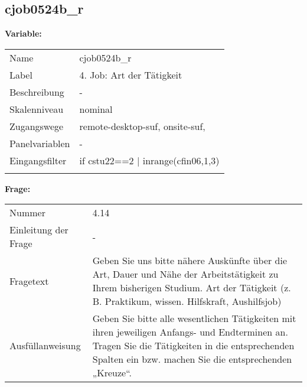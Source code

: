 	
	
	\subsection{cjob0524b\_r}
	\label{subSection:cjob0524b_r}

	\noindent\textbf{Variable:}\\
		\begin{tabular}{lL{11.3cm}}
			\label{tableVariable:cjob0524b_r}
			Name & cjob0524b\_r \\
			Label & 4. Job: Art der Tätigkeit \\
			Beschreibung & - \\
			Skalenniveau & nominal \\
			Zugangswege &
				remote-desktop-suf,
				onsite-suf,
 \\
			Panelvariablen & -
			 \\
			Eingangsfilter & if cstu22==2 | inrange(cfin06,1,3) \\
 \\
		\end{tabular}

		\vspace*{1 cm}
		\noindent\textbf{Frage:}\\
		\begin{tabular}{lL{11.3cm}}
			\label{tableQuestion:cjob0524b_r}
			Nummer & 4.14 \\
			Einleitung der Frage & - \\
			Fragetext & Geben Sie uns bitte nähere Auskünfte über die Art, Dauer und Nähe der Arbeitstätigkeit zu Ihrem bisherigen Studium.
Art der Tätigkeit
(z. B. Praktikum, wissen. Hilfskraft, Aushilfsjob) \\
			Ausfüllanweisung & Geben Sie bitte alle wesentlichen Tätigkeiten mit ihren jeweiligen Anfangs- und Endterminen an. Tragen Sie die Tätigkeiten in die entsprechenden Spalten ein bzw. machen Sie die entsprechenden „Kreuze“. \\
		\end{tabular}





